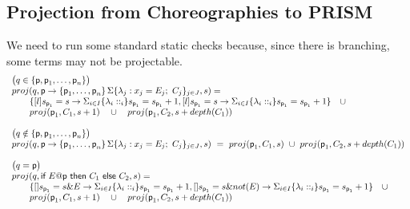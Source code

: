 \subsection{Projection from Choreographies to PRISM}
 We need to run some standard
static checks because, since there is branching, some terms may not be
projectable.
%
\begin{displaymath}
  \begin{array}{lllll}
    \big(q\in\{\role p, \role p_1,\ldots,\role p_n\}\big)\\
    \proj (q,\interact{p}{\role p_1,\ldots,\role p_n}, s)= \\
    \qquad\{ 
    \command l {s_{\role p_1} = s} \lambda: s_{\role p_1} = s_{\role p_1} +1,  
    \command l {s_{\role p_1} = s} \lambda: s_{\role p_1} = s_{\role p_1} +1  
    \}
    \quad\cup\\
    \qquad \proj (\role{p}_1, C_1, s+1)
    \quad\cup\quad
    \proj (\role{p}_1, C_2, s+\mathsf{depth}(C_1))
    \\\\
    \big(q\notin\{\role p, \role p_1,\ldots,\role p_n\}\big)\\
    \proj (q,\interact{p}{\role p_1,\ldots,\role p_n}, s)\ = \ \proj (\role{p}_1, C_1, s)
    \ \cup\
    \proj (\role{p}_1, C_2, s+\mathsf{depth}(C_1))
    \\\\
    \big(q = \role p\big)\\
    \proj (q,\ifTE {E}{p}{C_1}{C_2}, s)= \\
    \qquad\{ 
    \command {} {s_{\role p_1} = s \& E} \lambda: s_{\role p_1} = s_{\role p_1} +1,  
    \command {} {s_{\role p_1} = s \& \mathsf{not}(E)} \lambda: s_{\role p_1} = s_{\role p_1} +1  
    \}
    \quad\cup\\
    \qquad \proj (\role{p}_1, C_1, s+1)
    \quad\cup\quad
    \proj (\role{p}_1, C_2, s+\mathsf{depth}(C_1))
  \end{array}
\end{displaymath}


       







